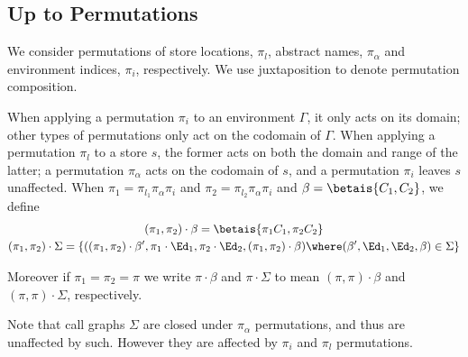 \subsection{Up to Permutations}
\begin{definition}[Permutations]
We consider permutations of store locations, $\pi_l$, abstract names, $\pi_\alpha$ and environment indices, $\pi_i$, respectively.
We use juxtaposition to denote permutation composition.

When applying a permutation $\pi_i$ to an environment $\Gamma$, it only acts on its domain; other types of permutations only act on the codomain of $\Gamma$.
When applying a permutation $\pi_l$ to a store $s$, the former acts on both the domain and range of the latter; a permutation $\pi_\alpha$ acts on the codomain of $s$, and a permutation $\pi_i$ leaves $s$ unaffected.
When $\pi_1=\pi_{l_1}\pi_\alpha\pi_i$ and $\pi_2=\pi_{l_2}\pi_\alpha\pi_i$
and $\beta=\betais{C_1,C_2}$, we define
  \begin{gather*}
    (\pi_1,\pi_2)\cdot\beta = \betais{\pi_1 C_1, \pi_2 C_2}
    \\
    (\pi_1,\pi_2)\cdot\Sigma =
      \{((\pi_1,\pi_2)\cdot\beta', \pi_1\cdot\Ed_1,\pi_2\cdot\Ed_2,(\pi_1,\pi_2)\cdot\beta) \where (\beta',\Ed_1,\Ed_2,\beta)\in\Sigma\}
  \end{gather*}

  Moreover if $\pi_1=\pi_2=\pi$ we write $\pi\cdot\beta$ and $\pi\cdot\Sigma$ to mean $(\pi,\pi)\cdot\beta$ and $(\pi,\pi)\cdot\Sigma$, respectively.
\end{definition}
Note that call graphs $\Sigma$ are closed under $\pi_\alpha$ permutations, and thus are unaffected by such. However they are affected by $\pi_i$ and $\pi_l$ permutations.

